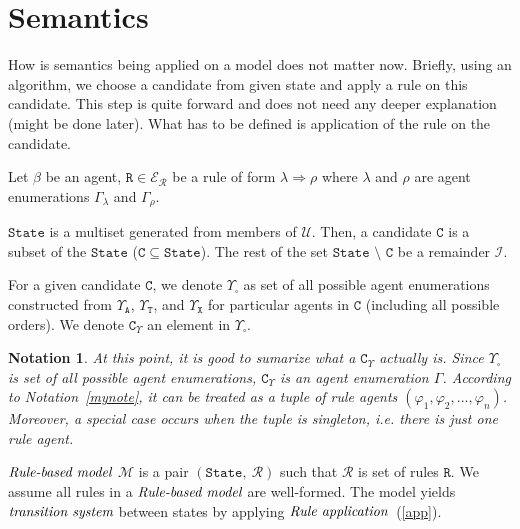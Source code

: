 \documentclass{entcs}
\renewcommand{\~}[0]{\texttildelow}
\newtheorem{notation}[thm]{Notation}
\begin{document}
\section{Semantics}

How is semantics being applied on a model does not matter now. Briefly, using an algorithm, we choose a candidate from given state and apply a rule on this candidate. This step is quite forward and does not need any deeper explanation (might be done later). What has to be defined is application of the rule on the candidate.

Let $\beta$ be an agent, $\mathtt{R} \in \mathcal{E}_\mathcal{R}$ be a rule of form $\lambda \Rightarrow \rho$ where $\lambda$ and $\rho$ are agent enumerations $\Gamma_\lambda$ and $\Gamma_\rho$.

\begin{defn}
$\mathtt{State}$ is a multiset generated from members of $\mathcal{U}$. Then, a candidate $\mathtt{C}$ is a subset of the $\mathtt{State}$ ($\mathtt{C} \subseteq \mathtt{State}$). The rest of the set $ \mathtt{State}$ $\setminus$ $\mathtt{C}$ be a remainder $\mathcal{I}$.
\end{defn}

\begin{defn}
For a given candidate $\mathtt{C}$, we denote $\Upsilon_{\square}$ as set of all possible agent enumerations constructed from $\Upsilon_\mathtt{A}$, $\Upsilon_\mathtt{T}$, and $\Upsilon_\mathtt{X}$ for particular agents in $\mathtt{C}$ (including all possible orders). We denote $\mathtt{C}_\Upsilon$ an element in $\Upsilon_{\square}$.
\end{defn}

\begin{notation}
At this point, it is good to sumarize what a $\mathtt{C}_\Upsilon$ actually is. Since $\Upsilon_{\square}$ is set of all possible agent enumerations, $\mathtt{C}_\Upsilon$ is an agent enumeration $\Gamma$. According to Notation~\ref{mynote}, it can be treated as a tuple of rule agents $(\varphi_1, \varphi_2, ..., \varphi_n)$. Moreover, a special case occurs when the tuple is singleton, i.e. there is just one rule agent.
\end{notation}

\begin{defn}
$\emph{Rule-based model}$ $\mathcal{M}$ is a pair $ (\mathtt{State},~\mathcal{R}) $ such that $\mathcal{R}$ is set of rules $\mathtt{R}$. We assume all rules in a $\emph{Rule-based model}$ are well-formed. The model yields $\emph{transition system}$ between states by applying $\emph{Rule application}$~(\ref{app}).
\end{defn}
\end{document}
